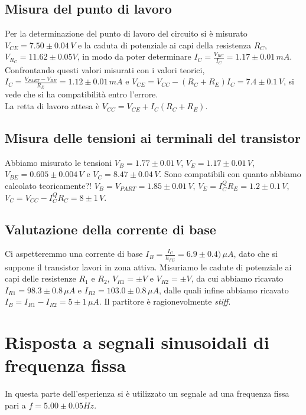 \documentclass[10pt,a4paper]{article}
\begin{document}
\subsection{Misura del punto di lavoro}
Per la determinazione del punto di lavoro del circuito si è misurato $V_{CE}= 7.50\pm0.04 \, V$ e la caduta di potenziale ai capi della resistenza $R_C$, $V_{R_C}= 11.62\pm0.05  V$, in modo da poter determinare $I_C=\frac{V_{RC}}{I_C} = 1.17\pm0.01\,mA$.
Confrontando questi valori misurati con i valori teorici, $I_C=\frac{V_{PART}-V_{BE}}{R_E}= 1.12\pm0.01\,mA$ e $V_{CE}=V_{CC}-(R_C+R_E)I_C= 7.4\pm0.1\,V$, si vede che si ha compatibilità entro l'errore.\\
La retta di lavoro attesa è  $V_{CC}=V_{CE}+I_C(R_C+R_E)$.


\subsection{Misura delle tensioni ai terminali del transistor}
Abbiamo misurato le tensioni $V_B= 1.77\pm0.01\,V$, $V_E= 1.17\pm0.01\,V$, $V_{BE}= 0.605\pm0.004\,V$ e $V_C= 8.47\pm0.04\,V$. Sono compatibili con quanto abbiamo calcolato teoricamente?! $V_B= V_{PART}=1.85 \pm 0.01\,V$, $V_E=I_C^Q R_E = 1.2 \pm 0.1 \,V$, $V_C=V_{CC}-I_C^Q R_C = 8 \pm 1 \, V$.


\subsection{Valutazione della corrente di base}
Ci aspetteremmo una corrente di base $I_B=\frac{I_C}{h_{FE}} = 6.9 \pm 0.4) \, \mu A$, dato che si suppone il transistor lavori in zona attiva. Misuriamo le cadute di potenziale ai capi delle resistenze $R_1$ e $R_2$, $V_{R1}= \pm V$ e $V_{R2}= \pm V$, da cui abbiamo ricavato $I_{R1} = 98.3\pm0.8 \, \mu A$ e $I_{R2} = 103.0\pm0.8 \, \mu A$, dalle quali infine abbiamo ricavato $I_B=I_{R1}-I_{R2}= 5\pm1 \,\mu A$. Il partitore è ragionevolmente \emph{stiff}.

\section{Risposta a segnali sinusoidali di frequenza fissa}
In questa parte dell'esperienza si è utilizzato un segnale ad una frequenza fissa pari a $f= 5.00\pm0.05 Hz$.
\end{document}
